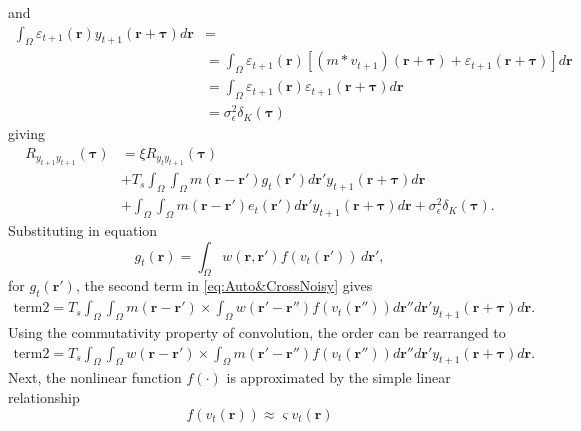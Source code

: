 \documentclass[]{article}
\begin{document}
and
\begin{align}
 \int_{\Omega}\varepsilon_{t+1}(\mathbf{r})y_{t+1}(\mathbf{r}+\boldsymbol{\tau}) d\mathbf{r}&= \nonumber \\
&=\int_{\Omega}\varepsilon_{t+1}(\mathbf{r})\left[(m \ast v_{t+1})(\mathbf r+\boldsymbol\tau)+ \varepsilon_{t+1}(\mathbf{r}+\boldsymbol{\tau})\right] d\mathbf{r} \nonumber \\
&=\int_{\Omega}\varepsilon_{t+1}(\mathbf{r}) \varepsilon_{t+1}(\mathbf{r}+\boldsymbol{\tau}) d\mathbf{r} \nonumber \\
&=\sigma_{\epsilon}^2\delta_K(\boldsymbol{\tau})
\end{align}
giving
\begin{align}\label{eq:Auto&CrossNoisy}
	R_{y_{t+1}y_{t+1}}(\boldsymbol{\tau}) &= \xi R_{y_ty_{t+1}}(\boldsymbol{\tau}) \nonumber \\
	&+ T_s \int_{\Omega}\int_{\Omega} m(\mathbf{r}-\mathbf{r}')  g_t(\mathbf{r}') d\mathbf{r}' y_{t+1}(\mathbf{r}+\boldsymbol{\tau}) d\mathbf{r} \nonumber \\
	&+\int_{\Omega}\int_{\Omega} m(\mathbf{r}-\mathbf{r}')e_t(\mathbf{r}')d\mathbf{r}'y_{t+1}(\mathbf{r}+\boldsymbol{\tau}) d\mathbf{r}+\sigma_{\epsilon}^2\delta_K(\boldsymbol{\tau}).
\end{align}
Substituting in equation
\begin{equation}
	\label{eq:RateBasedInteractions} g_t\left( \mathbf{r}\right) = \int_\Omega {w\left( \mathbf{r},\mathbf{r}' \right)f\left( v_t\left( \mathbf{r}'\right) \right)\, d\mathbf{r}'}, 
\end{equation}
for $g_t(\mathbf{r}')$, the second term in \eqref{eq:Auto&CrossNoisy} gives
\begin{align}
	\text{term2} = T_s \int_{\Omega}\int_{\Omega} m(\mathbf{r}-\mathbf{r}') 
	\times \int_{\Omega} w(\mathbf{r}'-\mathbf{r}'') f\left(v_t(\mathbf{r}'')\right)d\mathbf{r}'' d\mathbf{r}' y_{t+1}(\mathbf{r}+\boldsymbol{\tau}) d\mathbf{r}. 
\end{align} 
Using the commutativity property of convolution, the order can be rearranged to
\begin{align}
	\text{term2}  =  T_s \int_{\Omega}\int_{\Omega} w(\mathbf{r}-\mathbf{r}')
	\times \int_{\Omega} m(\mathbf{r}'-\mathbf{r}'') f\left(v_t(\mathbf{r}'')\right) d\mathbf{r}'' d\mathbf{r}' y_{t+1}(\mathbf{r}+\boldsymbol{\tau}) d\mathbf{r}.
\end{align}
Next, the nonlinear function $f(\cdot)$ is approximated by the simple linear relationship
\begin{equation}
	f\left(v_t(\mathbf{r})\right) \approx \varsigma v_t(\mathbf{r})
\end{equation} 
\end{document}
